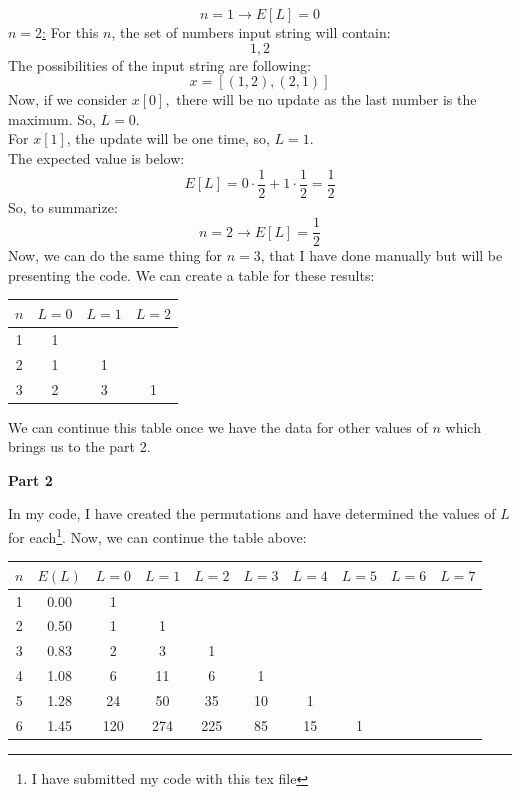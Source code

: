 \documentclass[a4paper]{exam}
\begin{document}
\begin{questions}
\begin{mdframed}
       \[\boxed{n = 1 \to E[L] = 0}\]
   \underline{$n = 2$:}
   For this $n$, the set of numbers input string will contain:
   \[ 1, 2 \]
   The possibilities of the input string are following:
   \[ x = [(1, 2), (2, 1)] \]
   Now, if we consider $x[0], $ there will be no update as the last number is the maximum. So, $L = 0$. \\
   For $x[1]$, the update will be one time, so, $L = 1$.\\
   The expected value is below:
   \[ E[L] = 0\cdot \frac{1}{2} + 1 \cdot \frac{1}{2} = \frac{1}{2} \]
   So, to summarize:
   \[ \boxed{n = 2 \to E[L] = \frac{1}{2}} \]
   Now, we can do the same thing for $n = 3$, that I have done manually but will be presenting the code. We can create a table for these results:
   \begin{table}[H]
       \centering
       \begin{tabular}{c|c|c|c}
          $n$  & $L = 0$ & $L = 1$ & $L = 2$ \\ \hline
           1 & 1 & \\ 
           2 & 1 & 1 &  \\
           3 & 2 & 3 & 1 \\ 
       \end{tabular}
   \end{table}
   We can continue this table once we have the data for other values of $n$ which brings us to the part 2.
   \begin{center}
     \textbf{Part 2}  
   \end{center}
   In my code, I have created the permutations and have determined the values of $L$ for each\footnote{I have submitted my code with this tex file}. Now, we can continue the table above:
   \begin{table}[H]
       \centering
       \begin{tabular}{c|c|c|c|c|c|c|c|c|c}
          $n$ & $E(L) $  & $L = 0$ & $L = 1$ & $L = 2$ & $L = 3$ & $L = 4$ & $L = 5$ & $L = 6$ & $L = 7$ \\ \hline
           1 & 0.00 & 1 & & & & & & \\ 
           2 & 0.50 & 1 & 1 & & & & &\\
           3 & 0.83 & 2 & 3 & 1 & & & &\\ 
           4 & 1.08 & 6 & 11 & 6 & 1 & & &\\
           5 & 1.28 & 24 & 50 & 35 & 10 & 1 & &\\
           6 & 1.45 & 120 & 274 & 225 & 85 & 15 & 1 &\\

\end{tabular}
\end{table}
\end{mdframed}
\end{questions}
\end{document}
